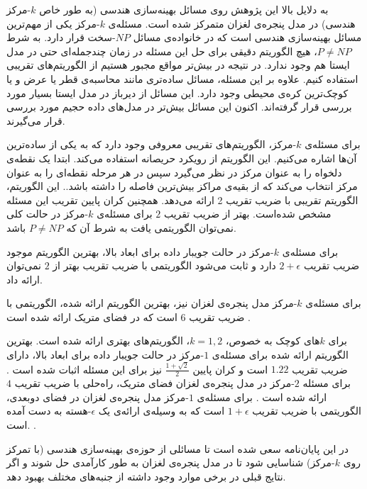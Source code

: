   به دلایل بالا این پژوهش روی مسائل بهینه‌سازی هندسی (به طور خاص $k$-مرکز هندسی) در مدل پنجره‌ی لغزان متمرکز شده است.
مسئله‌ی $k$-مرکز یکی از مهم‌ترین مسائل بهینه‌سازی هندسی است که در خانواده‌ی مسائل $NP$-سخت قرار دارد. به شرط $P \neq NP$، هیچ الگوریتم دقیقی برای حل این مسئله در زمان چندجمله‌ای حتی در مدل ایستا هم وجود ندارد. در نتیجه در بیش‌تر مواقع مجبور هستیم از الگوریتم‌های تقریبی   استفاده کنیم.
علاوه بر این مسئله، مسائل ساده‌تری مانند محاسبه‌ی قطر یا عرض و یا کوچک‌ترین کره‌ی محیطی وجود دارد. این مسائل  از دیرباز در مدل ایستا بسیار مورد بررسی قرار گرفته‌اند. اکنون این مسائل بیش‌تر در مدل‌های داده حجیم مورد بررسی قرار می‌گیرند.

برای مسئله‌ی $k$-مرکز، الگوریتم‌های تقریبی معروفی وجود دارد که به یکی از ساده‌ترین آن‌ها اشاره می‌کنیم.
این الگوریتم از رویکرد حریصانه  استفاده می‌کند.  ابتدا یک نقطه‌ی دلخواه را به عنوان مرکز در نظر می‌گیرد سپس در هر مرحله نقطه‌ای را به عنوان مرکز انتخاب می‌کند که از بقیه‌ی مراکز بیش‌ترین فاصله را داشته باشد..
این الگوریتم، الگوریتم تقریبی با ضریب تقریب 2 ارائه می‌دهد.
همچنین کران پایین تقریب این مسئله مشخص شده‌است. بهتر از ضریب تقریب $2$  برای مسئله‌ی $k$-مرکز در حالت کلی نمی‌توان الگوریتمی یافت به شرط آن که $P \neq NP$ باشد.

برای مسئله‌ی $k$-مرکز در حالت جویبار داده برای ابعاد بالا، بهترین الگوریتم موجود ضریب تقریب $2 + \epsilon$ دارد  و ثابت می‌شود الگوریتمی با ضریب تقریب بهتر از $2$ نمی‌توان ارائه داد.

برای مسئله‌ی $k$-مرکز مدل پنجره‌ی لغزان نیز، بهترین الگوریتم ارائه شده، الگوریتمی با ضریب تقریب $6$ است که  در فضای متریک ارائه شده است . 

برای $k$های کوچک به خصوص، $k =1, 2$، الگوریتم‌های بهتری ارائه شده است. بهترین الگوریتم ارائه شده برای مسئله‌ی $1$-مرکز در حالت جویبار داده برای ابعاد بالا، دارای ضریب تقریب $1.22$ است و کران پایین $\frac{1 + \sqrt{2}}{2}$ نیز برای این مسئله اثبات شده است . برای مسئله $2$-مرکز در مدل پنجره‌ی لغزان فضای متریک، راه‌حلی با ضریب تقریب $4$ ارائه شده است . برای مسئله‌ی $1$-مرکز مدل پنجره‌ی لغزان در فضای دوبعدی، الگوریتمی با ضریب تقریب $1+ \epsilon$ است که به وسیله‌ی ارائه‌ی یک $\epsilon$-هسته به دست آمده است. .


در این پایان‌نامه سعی شده است تا مسائلی از حوزه‌ی بهینه‌سازی هندسی (با تمرکز روی $k$-مرکز) شناسایی شود تا در مدل پنجره‌ی لغزان به طور کارآمدی حل شوند و اگر نتایج قبلی در برخی موارد وجود داشته از جنبه‌های مختلف بهبود دهد.

